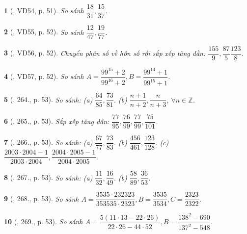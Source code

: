 \documentclass{article}
\newtheorem{baitoan}{}
\begin{document}
\begin{baitoan}[\cite{Tuyen_Toan_6}, VD54, p. 51]
	So sánh $\dfrac{18}{31},\dfrac{15}{37}$.
\end{baitoan}

\begin{baitoan}[\cite{Tuyen_Toan_6}, VD55, p. 52]
	So sánh $\dfrac{12}{47},\dfrac{19}{77}$.
\end{baitoan}

\begin{baitoan}[\cite{Tuyen_Toan_6}, VD56, p. 52]
	Chuyển phân số về hỗn số rồi sắp xếp tăng dần: $\dfrac{155}{9},\dfrac{87}{5}\dfrac{123}{8}$.
\end{baitoan}

\begin{baitoan}[\cite{Tuyen_Toan_6}, VD57, p. 52]
	So sánh $A = \dfrac{99^{15} + 2}{99^{16} + 2},B = \dfrac{99^{14} + 1}{99^{15} + 1}$.
\end{baitoan}

\begin{baitoan}[\cite{Tuyen_Toan_6}, 264., p. 53]
	So sánh: (a) $\dfrac{64}{85},\dfrac{73}{81}$. (b) $\dfrac{n + 1}{n + 2},\dfrac{n}{n + 3}$, $\forall n\in\mathbb{Z}$.
\end{baitoan}

\begin{baitoan}[\cite{Tuyen_Toan_6}, 265., p. 53]
	Sắp xếp tăng dần: $\dfrac{77}{95},\dfrac{76}{99},\dfrac{77}{99},\dfrac{75}{101}$.
\end{baitoan}

\begin{baitoan}[\cite{Tuyen_Toan_6}, 266., p. 53]
	So sánh: (a) $\dfrac{67}{77},\dfrac{73}{83}$. (b) $\dfrac{456}{461},\dfrac{123}{128}$. (c) $\dfrac{2003\cdot2004 - 1}{2003\cdot2004},\dfrac{2004\cdot2005 - 1}{2004\cdot2005}$.
\end{baitoan}

\begin{baitoan}[\cite{Tuyen_Toan_6}, 267., p. 53]
	So sánh: (a) $\dfrac{11}{32},\dfrac{16}{49}$. (b) $\dfrac{58}{89},\dfrac{36}{53}$.
\end{baitoan}

\begin{baitoan}[\cite{Tuyen_Toan_6}, 268., p. 53]
	So sánh $A = \dfrac{3535\cdot232323}{353535\cdot2323},B = \dfrac{3535}{3534},C = \dfrac{2323}{2322}$.
\end{baitoan}

\begin{baitoan}[\cite{Tuyen_Toan_6}, 269., p. 53]
	So sánh $A = \dfrac{5(11\cdot13 - 22\cdot26)}{22\cdot26 - 44\cdot52},B = \dfrac{138^2 - 690}{137^2 - 548}$.
\end{baitoan}
\end{document}
